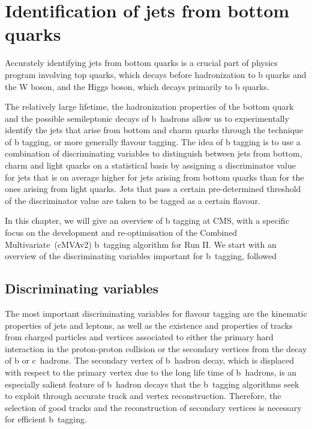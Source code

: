 \chapter{Identification of jets from bottom quarks}
Accurately identifying jets from bottom quarks is a crucial part of physics program involving top quarks, which decays before hadronization to b quarks and the W boson, and the Higgs boson, which decays primarily to b quarks.

The relatively large lifetime, the hadronization properties of the bottom quark and the possible semileptonic decays of b~hadrons allow us to experimentally identify the jets that arise from bottom and charm quarks through the technique of b tagging, or more generally flavour tagging. The idea of b tagging is to use a combination of discriminating variables to distinguish between jets from bottom, charm and light quarks on a statistical basis by assigning a discriminator value for jets that is on average higher for jets arising from bottom quarks than for the ones arising from light quarks. Jets that pass a certain pre-determined threshold of the discriminator value are taken to be tagged as a certain flavour.

In this chapter, we will give an overview of b tagging at CMS, with a specific focus on the development and re-optimisation of the Combined Multivariate~(cMVAv2) b~tagging algorithm for Run II. We start with an overview of the discriminating variables important for b~tagging, followed 

\section{Discriminating variables}
The most important discriminating variables for flavour tagging are the kinematic properties of jets and leptons, as well as the existence and properties of tracks from charged particles and vertices associated to either the primary hard interaction in the proton-proton collision or the secondary vertices from the decay of b or c~hadrons. The secondary vertex of b~hadron decay, which is displaced with respect to the primary vertex due to the long life time of b~hadrons, is an especially salient feature of b~hadron decays that the b~tagging algorithms seek to exploit through accurate track and vertex reconstruction. Therefore, the selection of good tracks and the reconstruction of secondary vertices is necessary for efficient b~tagging.

